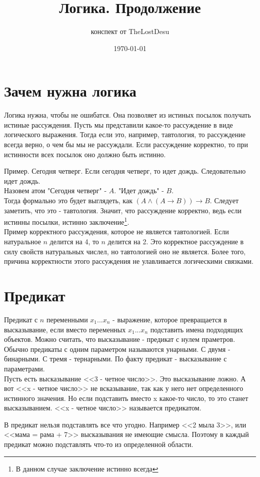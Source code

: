 \documentclass[a4paper,12pt]{article}
\author{конспект от TheLostDesu}
\title{Логика. Продолжение}
\date{\today}
\begin{document}
\maketitle
\section{Зачем нужна логика}
Логика нужна, чтобы не ошибатся. Она позволяет из истиных посылок получать истиные рассуждения. Пусть мы представили какое-то рассуждение в виде логического выражения. Тогда если это, например, тавтология, то рассуждение всегда верно, о чем бы мы не рассуждали. Если рассуждение корректно, то при истинности всех посылок оно должно быть истинно.

Пример. Сегодня четверг. Если сегодня четверг, то идет дождь. Следовательно идет дождь.\\
Назовем атом "Сегодня четверг" - $A$. "Идет дождь" - $B$. \\
Тогда формально это будет выглядеть, как $(A \wedge (A\rightarrow B)) \rightarrow B$.
Следует заметить, что это - тавтология. Значит, что рассуждение корректно, ведь если истинны посылки, истинно заключение\footnote{В данном случае заключение истинно всегда}.\\
Пример корректного рассуждения, которое не является тавтологией. Если натуральное $n$ делится на 4, то $n$ делится на 2. Это корректное рассуждение в силу свойств натуральных числел, но тавтологией оно не является. Более того, причина корректности этого рассуждения не улавливается логическими связками.\\
\section{Предикат}
Предикат с $n$ переменными $x_1...x_n$ - выражение, которое превращается в высказывание, если вместо переменных $x_1...x_n$ подставить имена подходящих объектов. Можно считать, что высказывание - предикат с нулем праметров. Обычно предикаты с одним параметром называются унарными. С двумя - бинарными. С тремя - тернарными.
По факту предикат - высказывание с параметрами.\\
Пусть есть высказывание <<3 - четное число>>. Это высказывание ложно. А вот <<x - четное число>> не всказывание, так как у него нет определенного истинного значения. Но если подставить вместо x какое-то число, то это станет высказыванием. <<x - четное число>> называется предикатом.

В предикат нельзя подставлять все что угодно. Например <<2 мыла 3>>, или <<мама = рама + 7>> высказывания не имеющие смысла. Поэтому в каждый предикат можно подставлять что-то из определенной области. 
\end{document}
